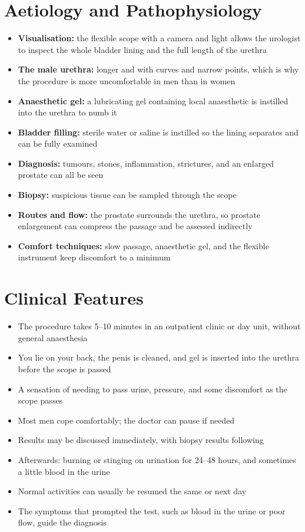 \section*{Aetiology and Pathophysiology}
\begin{itemize}
    \item \textbf{Visualisation:} the flexible scope with a camera and light allows the urologist to inspect the whole bladder lining and the full length of the urethra
    \item \textbf{The male urethra:} longer and with curves and narrow points, which is why the procedure is more uncomfortable in men than in women
    \item \textbf{Anaesthetic gel:} a lubricating gel containing local anaesthetic is instilled into the urethra to numb it
    \item \textbf{Bladder filling:} sterile water or saline is instilled so the lining separates and can be fully examined
    \item \textbf{Diagnosis:} tumours, stones, inflammation, strictures, and an enlarged prostate can all be seen
    \item \textbf{Biopsy:} suspicious tissue can be sampled through the scope
    \item \textbf{Routes and flow:} the prostate surrounds the urethra, so prostate enlargement can compress the passage and be assessed indirectly
    \item \textbf{Comfort techniques:} slow passage, anaesthetic gel, and the flexible instrument keep discomfort to a minimum
\end{itemize}

\section*{Clinical Features}
\begin{itemize}
    \item The procedure takes 5--10 minutes in an outpatient clinic or day unit, without general anaesthesia
    \item You lie on your back, the penis is cleaned, and gel is inserted into the urethra before the scope is passed
    \item A sensation of needing to pass urine, pressure, and some discomfort as the scope passes
    \item Most men cope comfortably; the doctor can pause if needed
    \item Results may be discussed immediately, with biopsy results following
    \item Afterwards: burning or stinging on urination for 24--48 hours, and sometimes a little blood in the urine
    \item Normal activities can usually be resumed the same or next day
    \item The symptoms that prompted the test, such as blood in the urine or poor flow, guide the diagnosis
\end{itemize}

